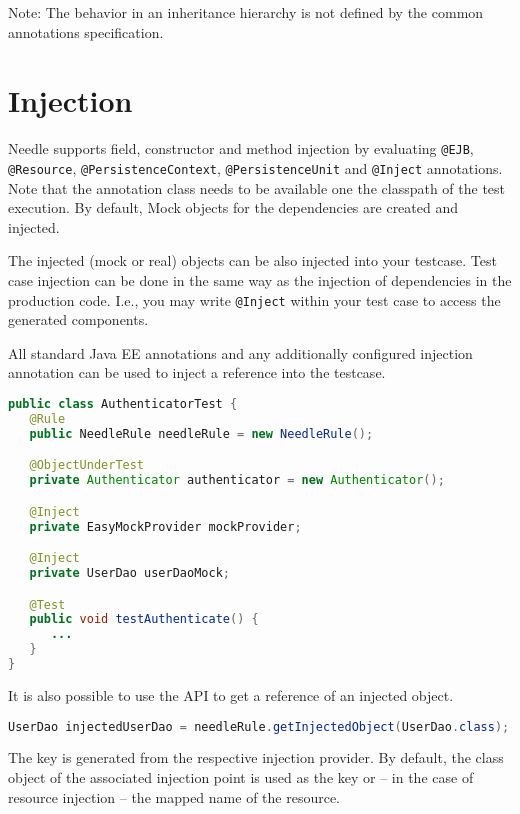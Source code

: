 Note: The behavior in an inheritance hierarchy is not defined by the common annotations specification.

\section{Injection}
\label{sec:Injection}

Needle supports field, constructor and method injection by evaluating \verb|@EJB|, \verb|@Resource|, \verb|@PersistenceContext|, \verb|@PersistenceUnit|
and \verb|@Inject| annotations. Note that the annotation class needs to be available one the classpath of the test execution.
By default, Mock objects for the dependencies are created and injected.

The injected (mock or real) objects can be also injected into your testcase. Test case injection can be done in the same way as the injection of dependencies in the production code. I.e., you may write \verb|@Inject| within your test case to access
the generated components.

All standard Java EE annotations and any additionally configured injection annotation can be used to inject a reference into the testcase.

\begin{lstlisting}[language={JAVA},caption=Testcase injection]
public class AuthenticatorTest {
   @Rule
   public NeedleRule needleRule = new NeedleRule();

   @ObjectUnderTest
   private Authenticator authenticator = new Authenticator();

   @Inject
   private EasyMockProvider mockProvider;

   @Inject
   private UserDao userDaoMock;

   @Test
   public void testAuthenticate() {
      ...
   }
}
\end{lstlisting}

It is also possible to use the API to get a reference of an injected object.

\begin{lstlisting}[language={JAVA},caption=Injected Components]
UserDao injectedUserDao = needleRule.getInjectedObject(UserDao.class);
\end{lstlisting}

The key is generated from the respective injection provider. By default, the class object of the associated injection point is used as the key or
-- in the case of resource injection -- the mapped name of the resource.

